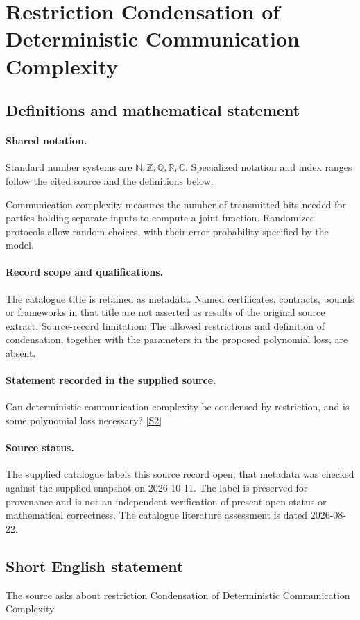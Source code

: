 \documentclass[11pt]{article}
\newcommand{\sref}[2]{\hyperlink{source:#1:#2}{[S#2]}}
\begin{document}
\section{Restriction Condensation of Deterministic Communication Complexity}\label{statement}

\subsection{Definitions and mathematical statement}

\paragraph{Shared notation.}Standard number systems are $\mathbb N,\mathbb Z,\mathbb Q,\mathbb R,\mathbb C$. Specialized notation and index ranges follow the cited source and the definitions below.


Communication complexity measures the number of transmitted bits needed for parties holding separate inputs to compute a joint function. Randomized protocols allow random choices, with their error probability specified by the model.
\paragraph{Record scope and qualifications.}
The catalogue title is retained as metadata. Named certificates, contracts, bounds or frameworks in that title are not asserted as results of the original source extract.
Source-record limitation: The allowed restrictions and definition of condensation, together with the parameters in the proposed polynomial loss, are absent.
\paragraph{Statement recorded in the supplied source.}
Can deterministic communication complexity be condensed by restriction, and is some polynomial loss necessary? \sref{statement}{2}
\paragraph{Source status.}
The supplied catalogue labels this source record open; that metadata was checked against the supplied snapshot on 2026-10-11. The label is preserved for provenance and is not an independent verification of present open status or mathematical correctness. The catalogue literature assessment is dated 2026-08-22.
\subsection{Short English statement}
The source asks about restriction Condensation of Deterministic Communication Complexity.
\end{document}
